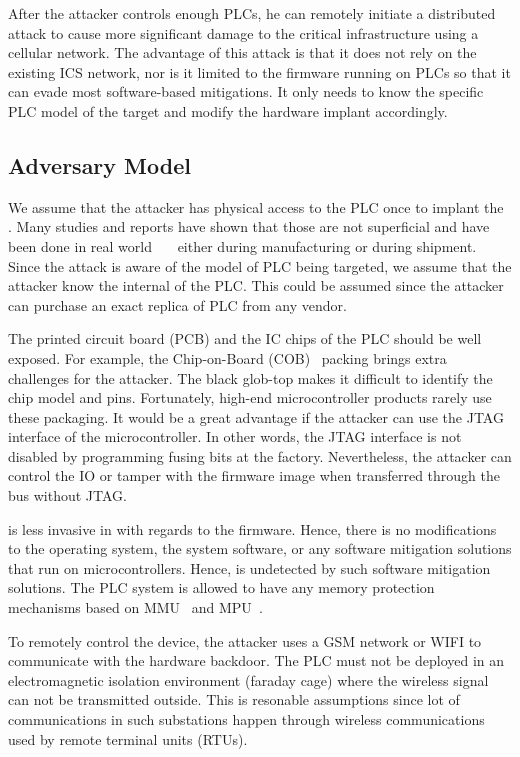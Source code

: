 After the attacker controls enough PLCs, he can remotely initiate a distributed attack to cause more significant damage to the critical infrastructure using a cellular network. The advantage of this attack is that it does not rely on the existing ICS network, nor is it limited to the firmware running on PLCs so that it can evade most software-based mitigations. It only needs to know the specific PLC model of the target and modify the hardware implant accordingly.


\subsection{Adversary Model}

We assume that the attacker has physical access to the PLC once to implant the \name. Many studies and reports have shown that those are not superficial and have been done in real world~\cite{harrison2021malicious}~\cite{o2015special}~\cite{robertson2018big} either during manufacturing or during shipment. Since the attack is aware of the model of PLC being targeted, we assume that the attacker know the internal of the PLC. This could be assumed since the attacker can purchase an exact replica of PLC from any vendor. 


The printed circuit board (PCB) and the IC chips of the PLC should be well exposed. For example, the Chip-on-Board (COB)~\cite{lau1994chip} packing brings extra challenges for the attacker. The black glob-top makes it difficult to identify the chip model and pins. Fortunately, high-end microcontroller products rarely use these packaging. It would be a great advantage if the attacker can use the JTAG interface of the microcontroller. In other words, the JTAG interface is not disabled by programming fusing bits at the factory. Nevertheless, the attacker can control the IO or tamper with the firmware image when transferred through the bus without JTAG.

\name is less invasive in with regards to the firmware. Hence, there is no modifications to the operating system, the system software, or any software mitigation solutions that run on microcontrollers. Hence, \name is undetected by such software mitigation solutions. The PLC system is allowed to have any memory protection mechanisms based on MMU~\cite{shalan2000dynamic} and MPU~\cite{kim2018securing}.

To remotely control the device, the attacker uses a GSM network or WIFI to communicate with the hardware backdoor. The PLC must not be deployed in an electromagnetic isolation environment (faraday cage) where the wireless signal can not be transmitted outside. This is resonable assumptions since lot of communications in such substations happen through wireless communications used by remote terminal units (RTUs).



